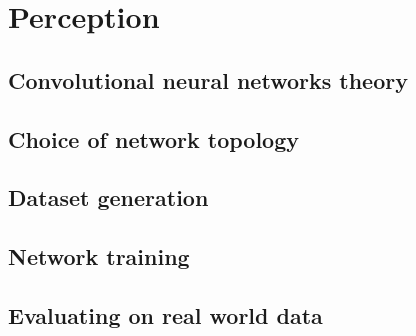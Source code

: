 \chapter{Perception}

\section{Convolutional neural networks theory}





\section{Choice of network topology}




\section{Dataset generation}






\section{Network training}


\section{Evaluating on real world data}

